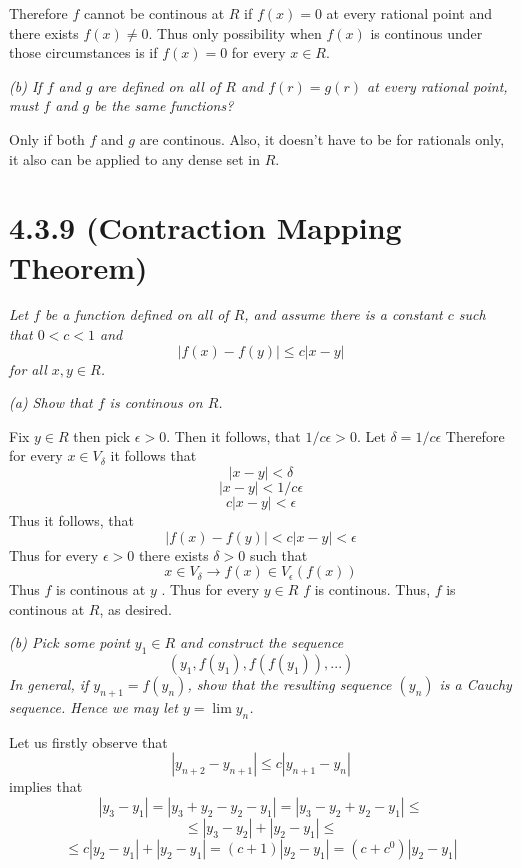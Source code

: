 \documentclass[11pt,oneside,titlepage]{book}
\begin{document}
Therefore $f$ cannot be continous at $R$ if $f(x) = 0$ at every rational point
and there exists $f(x) \neq 0$. Thus only possibility when $f(x)$ is
continous under those circumstances is if $f(x) = 0$ for every $x \in R$.

\textit{(b) If $f$ and $g$ are defined on all of $R$ and $f(r) = g(r)$ at
  every rational  point, must $f$ and $g$ be the same functions? }

Only if both  $f$ and $g$ are continous. Also, it doesn't have to be for
rationals only, it also can be applied to any dense set in $R$.

\section*{4.3.9 (Contraction Mapping Theorem)}
\textit{Let $f$ be a function defined on all of $R$, and assume there is a
  constant $c$ such that $0 < c < 1$ and}
$$|f(x) - f(y)| \leq c|x - y|$$
\textit{for all $x,y \in R$.}

\textit{(a) Show that $f$ is continous on $R$.}

Fix $y \in R$ then pick $\epsilon > 0$.
Then it follows, that $1/c \epsilon > 0$. Let $\delta = 1/c \epsilon$
Therefore for every  $x \in V_\delta$ it follows that
$$|x - y| < \delta$$
$$|x - y| < 1/c \epsilon$$
$$c |x - y| <  \epsilon$$
Thus it follows, that
$$|f(x) - f(y)| < c |x - y| <  \epsilon$$
Thus for every $\epsilon > 0$ there exists $\delta > 0$ such that
$$x \in V_\delta \to f(x) \in V_\epsilon(f(x))$$
Thus $f$ is continous at $y$ . Thus for every $y \in R$ $f$ is continous.
Thus, $f$ is continous at $R$, as desired.

\textit{(b) Pick some point $y_1 \in R$ and construct the sequence }
$$(y_1, f(y_1), f(f(y_1)), ... )$$
\textit{In general, if $y_{n + 1} = f(y_n)$, show that
  the resulting sequence $(y_n)$
  is a Cauchy sequence. Hence we may let $y = \lim y_n$.}







Let us firstly observe that
$$|y_{n + 2} - y_{n + 1}| \leq c|y_{n + 1} - y_n|$$
implies that 
$$|y_3 - y_1| = |y_3 + y_2 - y_2 - y_1| = |y_3 - y_2 + y_2 - y_1| \leq $$
$$ \leq  |y_3 - y_2| + |y_2 - y_1| \leq$$
$$\leq c|y_2 - y_1| + |y_2 - y_1| =
(c + 1) |y_2 - y_1| = (c + c^0) |y_2 - y_1|$$
\end{document}
